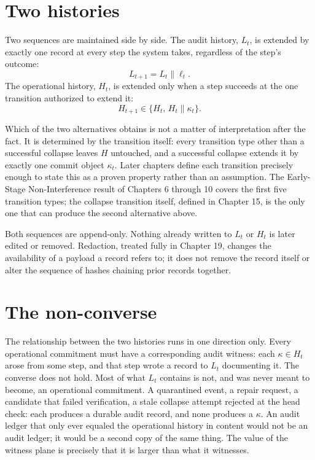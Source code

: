 \documentclass[11pt,openany]{book}
\begin{document}
\section{Two histories}

Two sequences are maintained side by side. The audit history, \(L_t\), is
extended by exactly one record at every step the system takes, regardless of
the step's outcome:
\[
  L_{t+1}=L_t\mathbin{\|}\ell_t.
\]
The operational history, \(H_t\), is extended only when a step succeeds at the
one transition authorized to extend it:
\[
  H_{t+1}\in\{H_t,\,H_t\mathbin{\|}\kappa_t\}.
\]

Which of the two alternatives obtains is not a matter of interpretation after
the fact. It is determined by the transition itself: every transition type
other than a successful collapse leaves \(H\) untouched, and a successful
collapse extends it by exactly one commit object \(\kappa_t\). Later chapters
define each transition precisely enough to state this as a proven property
rather than an assumption. The Early-Stage Non-Interference result of Chapters
6 through 10 covers the first five transition types; the collapse transition
itself, defined in Chapter 15, is the only one that can produce the second
alternative above.

Both sequences are append-only. Nothing already written to \(L_t\) or
\(H_t\) is later edited or removed. Redaction, treated fully in Chapter 19,
changes the availability of a payload a record refers to; it does not remove
the record itself or alter the sequence of hashes chaining prior records
together.

\section{The non-converse}

The relationship between the two histories runs in one direction only. Every
operational commitment must have a corresponding audit witness: each
\(\kappa\in H_t\) arose from some step, and that step wrote a record to
\(L_t\) documenting it. The converse does not hold. Most of what \(L_t\)
contains is not, and was never meant to become, an operational commitment. A
quarantined event, a repair request, a candidate that failed verification, a
stale collapse attempt rejected at the head check: each produces a durable
audit record, and none produces a \(\kappa\). An audit ledger that only ever
equaled the operational history in content would not be an audit ledger; it
would be a second copy of the same thing. The value of the witness plane is
precisely that it is larger than what it witnesses.
\end{document}

